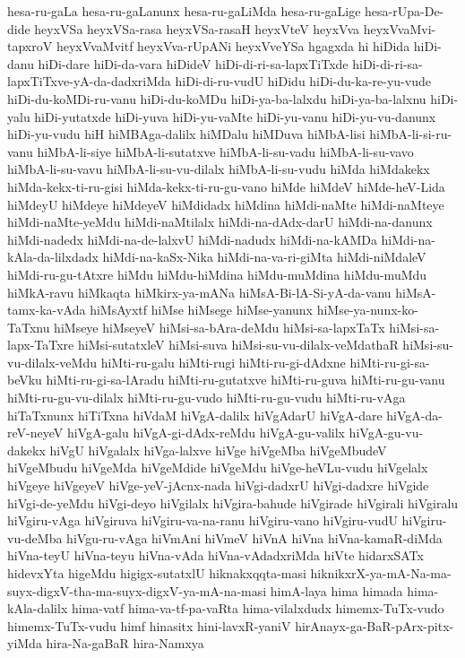 {hesa-ru-gaLa
hesa-ru-gaLanunx
hesa-ru-gaLiMda
hesa-ru-gaLige
hesa-rUpa-De-dide
heyxVSa
heyxVSa-rasa
heyxVSa-rasaH
heyxVteV
heyxVva
heyxVvaMvi-tapxroV
heyxVvaMvitf
heyxVva-rUpANi
heyxVveYSa
hgagxda
hi
hiDida
hiDi-danu
hiDi-dare
hiDi-da-vara
hiDideV
hiDi-di-ri-sa-lapxTiTxde
hiDi-di-ri-sa-lapxTiTxve-yA-da-dadxriMda
hiDi-di-ru-vudU
hiDidu
hiDi-du-ka-re-yu-vude
hiDi-du-koMDi-ru-vanu
hiDi-du-koMDu
hiDi-ya-ba-lalxdu
hiDi-ya-ba-lalxnu
hiDi-yalu
hiDi-yutatxde
hiDi-yuva
hiDi-yu-vaMte
hiDi-yu-vanu
hiDi-yu-vu-danunx
hiDi-yu-vudu
hiH
hiMBAga-dalilx
hiMDalu
hiMDuva
hiMbA-lisi
hiMbA-li-si-ru-vanu
hiMbA-li-siye
hiMbA-li-sutatxve
hiMbA-li-su-vadu
hiMbA-li-su-vavo
hiMbA-li-su-vavu
hiMbA-li-su-vu-dilalx
hiMbA-li-su-vudu
hiMda
hiMdakekx
hiMda-kekx-ti-ru-gisi
hiMda-kekx-ti-ru-gu-vano
hiMde
hiMdeV
hiMde-heV-Lida
hiMdeyU
hiMdeye
hiMdeyeV
hiMdidadx
hiMdina
hiMdi-naMte
hiMdi-naMteye
hiMdi-naMte-yeMdu
hiMdi-naMtilalx
hiMdi-na-dAdx-darU
hiMdi-na-danunx
hiMdi-nadedx
hiMdi-na-de-lalxvU
hiMdi-nadudx
hiMdi-na-kAMDa
hiMdi-na-kAla-da-lilxdadx
hiMdi-na-kaSx-Nika
hiMdi-na-va-ri-giMta
hiMdi-niMdaleV
hiMdi-ru-gu-tAtxre
hiMdu
hiMdu-hiMdina
hiMdu-muMdina
hiMdu-muMdu
hiMkA-ravu
hiMkaqta
hiMkirx-ya-mANa
hiMsA-Bi-lA-Si-yA-da-vanu
hiMsA-tamx-ka-vAda
hiMsAyxtf
hiMse
hiMsege
hiMse-yanunx
hiMse-ya-nunx-ko-TaTxnu
hiMseye
hiMseyeV
hiMsi-sa-bAra-deMdu
hiMsi-sa-lapxTaTx
hiMsi-sa-lapx-TaTxre
hiMsi-sutatxleV
hiMsi-suva
hiMsi-su-vu-dilalx-veMdathaR
hiMsi-su-vu-dilalx-veMdu
hiMti-ru-galu
hiMti-rugi
hiMti-ru-gi-dAdxne
hiMti-ru-gi-sa-beVku
hiMti-ru-gi-sa-lAradu
hiMti-ru-gutatxve
hiMti-ru-guva
hiMti-ru-gu-vanu
hiMti-ru-gu-vu-dilalx
hiMti-ru-gu-vudo
hiMti-ru-gu-vudu
hiMti-ru-vAga
hiTaTxnunx
hiTiTxna
hiVdaM
hiVgA-dalilx
hiVgAdarU
hiVgA-dare
hiVgA-da-reV-neyeV
hiVgA-galu
hiVgA-gi-dAdx-reMdu
hiVgA-gu-valilx
hiVgA-gu-vu-dakekx
hiVgU
hiVgalalx
hiVga-lalxve
hiVge
hiVgeMba
hiVgeMbudeV
hiVgeMbudu
hiVgeMda
hiVgeMdide
hiVgeMdu
hiVge-heVLu-vudu
hiVgelalx
hiVgeye
hiVgeyeV
hiVge-yeV-jAcnx-nada
hiVgi-dadxrU
hiVgi-dadxre
hiVgide
hiVgi-de-yeMdu
hiVgi-deyo
hiVgilalx
hiVgira-bahude
hiVgirade
hiVgirali
hiVgiralu
hiVgiru-vAga
hiVgiruva
hiVgiru-va-na-ranu
hiVgiru-vano
hiVgiru-vudU
hiVgiru-vu-deMba
hiVgu-ru-vAga
hiVmAni
hiVmeV
hiVnA
hiVna
hiVna-kamaR-diMda
hiVna-teyU
hiVna-teyu
hiVna-vAda
hiVna-vAdadxriMda
hiVte
hidarxSATx
hidevxYta
higeMdu
higigx-sutatxlU
hiknakxqqta-masi
hiknikxrX-ya-mA-Na-ma-suyx-digxV-tha-ma-suyx-digxV-ya-mA-na-masi
himA-laya
hima
himada
hima-kAla-dalilx
hima-vatf
hima-va-tf-pa-vaRta
hima-vilalxdudx
himemx-TuTx-vudo
himemx-TuTx-vudu
himf
hinasitx
hini-lavxR-yaniV
hirAnayx-ga-BaR-pArx-pitx-yiMda
hira-Na-gaBaR
hira-Namxya
}
